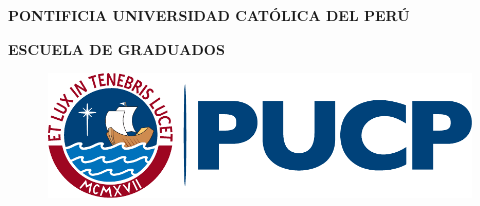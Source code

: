 \begin{titlepage}
		\begin{center}
			\vspace*{1cm}
			\textbf{{\Large PONTIFICIA UNIVERSIDAD CATÓLICA DEL PERÚ }}\\
			\vspace*{0.55cm}
			
			\textbf{{\Large ESCUELA DE GRADUADOS}}\\
			
			\vspace{1cm}
			\begin{figure}[H]
				\centering
				\includegraphics[scale=.6]{figuras/logo-pucp.pdf}
			\end{figure}
			\vspace{1cm}
			

\end{center}
\end{titlepage}
